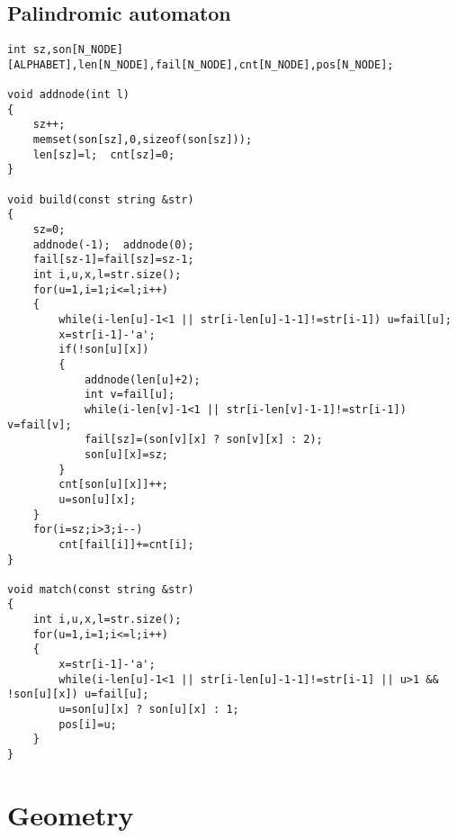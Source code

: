 \documentclass[a4paper,12pt]{article}
\begin{document}
\subsection{Palindromic automaton}
\begin{lstlisting}
int sz,son[N_NODE][ALPHABET],len[N_NODE],fail[N_NODE],cnt[N_NODE],pos[N_NODE];

void addnode(int l)
{
    sz++;
    memset(son[sz],0,sizeof(son[sz]));
    len[sz]=l;  cnt[sz]=0;
}

void build(const string &str)
{
    sz=0;
    addnode(-1);  addnode(0);
    fail[sz-1]=fail[sz]=sz-1;
    int i,u,x,l=str.size();
    for(u=1,i=1;i<=l;i++)
    {
        while(i-len[u]-1<1 || str[i-len[u]-1-1]!=str[i-1]) u=fail[u];
        x=str[i-1]-'a';
        if(!son[u][x])
        {
            addnode(len[u]+2);
            int v=fail[u];
            while(i-len[v]-1<1 || str[i-len[v]-1-1]!=str[i-1]) v=fail[v];
            fail[sz]=(son[v][x] ? son[v][x] : 2);
            son[u][x]=sz;
        }
        cnt[son[u][x]]++;
        u=son[u][x];
    }
    for(i=sz;i>3;i--)
        cnt[fail[i]]+=cnt[i];
}

void match(const string &str)
{
    int i,u,x,l=str.size();
    for(u=1,i=1;i<=l;i++)
    {
        x=str[i-1]-'a';
        while(i-len[u]-1<1 || str[i-len[u]-1-1]!=str[i-1] || u>1 && !son[u][x]) u=fail[u];
        u=son[u][x] ? son[u][x] : 1;
        pos[i]=u;
    }
}
\end{lstlisting}


\section{Geometry}
\end{document}
